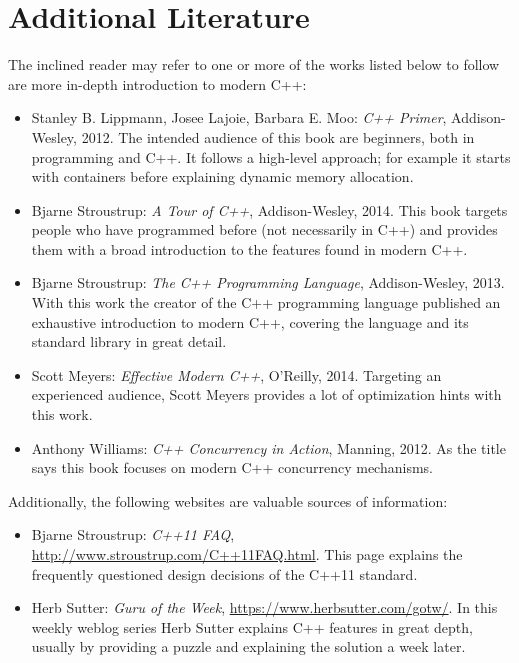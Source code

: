 \section{Additional Literature}

The inclined reader may refer to one or more of the works listed below to follow are more in-depth introduction to modern C++:

\begin{itemize}
\item Stanley B. Lippmann, Josee Lajoie, Barbara E. Moo: \textit{C++ Primer}, Addison-Wesley, 2012. The intended audience of this book are beginners, both in programming and C++. It follows a high-level approach; for example it starts with containers before explaining dynamic memory allocation.
\item Bjarne Stroustrup: \textit{A Tour of C++}, Addison-Wesley, 2014. This book targets people who have programmed before (not necessarily in C++) and provides them with a broad introduction to the features found in modern C++.
\item Bjarne Stroustrup: \textit{The C++ Programming Language}, Addison-Wesley, 2013. With this work the creator of the C++ programming language published an exhaustive introduction to modern C++, covering the language and its standard library in great detail.
\item Scott Meyers: \textit{Effective Modern C++}, O'Reilly, 2014. Targeting an experienced audience, Scott Meyers provides a lot of optimization hints with this work.
\item Anthony Williams: \textit{C++ Concurrency in Action}, Manning, 2012. As the title says this book focuses on modern C++ concurrency mechanisms.
\end{itemize}

Additionally, the following websites are valuable sources of information:

\begin{itemize}
\item Bjarne Stroustrup: \textit{C++11 FAQ}, \url{http://www.stroustrup.com/C++11FAQ.html}. This page explains the frequently questioned design decisions of the C++11 standard.
\item Herb Sutter: \textit{Guru of the Week}, \url{https://www.herbsutter.com/gotw/}. In this weekly weblog series Herb Sutter explains C++ features in great depth, usually by providing a puzzle and explaining the solution a week later.
\end{itemize}